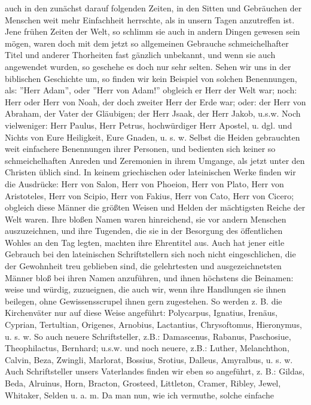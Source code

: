 auch in den zunächst darauf folgenden Zeiten, in den Sitten und Gebräuchen der
Menschen weit mehr Einfachheit herrschte, als in unsern Tagen anzutreffen ist.
Jene frühen Zeiten der Welt, so schlimm sie auch in andern Dingen gewesen sein
mögen, waren doch mit dem jetzt so allgemeinen Gebrauche schmeichelhafter Titel
und anderer Thorheiten fast gänzlich unbekannt, und wenn sie auch angewendet
wurden, so geschehe es doch nur sehr selten. Sehen wir uns in der biblischen
Geschichte um, so finden wir kein Beispiel von solchen Benennungen, als: ''Herr
Adam'', oder ''Herr von Adam!'' obgleich er Herr der Welt war; noch: Herr oder
Herr von Noah, der doch zweiter Herr der Erde war; oder: der Herr von Abraham,
der Vater der Gläubigen; der Herr Jsaak, der Herr Jakob, u.s.w. Noch
vielweniger: Herr Paulus, Herr Petrus, hochwürdiger Herr Apostel, u. dgl. und
Nichts von Eure Heiligkeit, Eure Gnaden, u. s. w. Selbst die Heiden gebrauchten
weit einfachere Benennungen ihrer Personen, und bedienten sich keiner so
schmeichelhaften Anreden und Zeremonien in ihrem Umgange, als jetzt unter den
Christen üblich sind. In keinem griechischen oder lateinischen Werke finden wir
die Ausdrücke: Herr von Salon, Herr von Phoeion, Herr von Plato, Herr von
Aristoteles, Herr von Scipio, Herr von Fakius, Herr von Cato, Herr von Cicero;
obgleich diese Männer die größten Weisen und Helden der mächtigsten Reiche der
Welt waren. Ihre bloßen Namen waren hinreichend, sie vor andern Menschen
auszuzeichnen, und ihre Tugenden, die sie in der Besorgung des öffentlichen
Wohles an den Tag legten, machten ihre Ehrentitel aus. Auch hat jener eitle
Gebrauch bei den lateinischen Schriftstellern sich noch nicht eingeschlichen,
die der Gewohnheit treu geblieben sind, die gelehrtesten und ausgezeichnetsten
Männer bloß bei ihren Namen anzuführen, und ihnen höchstens die Beinamen: weise
und würdig, zuzueignen, die auch wir, wenn ihre Handlungen sie ihnen beilegen,
ohne Gewissensscrupel ihnen gern zugestehen. So werden z. B. die Kirchenväter
nur auf diese Weise angeführt: Polycarpus, Ignatius, Irenäus, Cyprian,
Tertultian, Origenes, Arnobius, Lactantius, Chrysoftomus, Hieronymus, u. s. w.
So auch neuere Schriftsteller, z.B.: Damascenus, Rabanus, Paschosiue,
Theophilactus, Bernhard; u.s.w. und noch neuere, z.B.: Luther, Melanchthon,
Calvin, Beza, Zwingli, Marlorat, Bossius, Srotius, Dalleus, Amyralbus, u. s. w.
Auch Schriftsteller unsers Vaterlandes finden wir eben so angeführt, z. B.:
Gildas, Beda, Alruinus, Horn, Bracton, Grosteed, Littleton, Cramer, Ribley,
Jewel, Whitaker, Selden u. a. m. Da man nun, wie ich vermuthe, solche einfache
